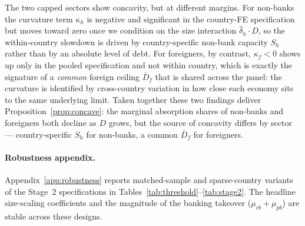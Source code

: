 \documentclass[\latexroot/\projectname]{subfiles}
\begin{document}
The two capped sectors show concavity, but at different margins.
For non-banks the curvature term $\kappa_h$ is negative and
significant in the country-FE specification but moves toward zero
once we condition on the size interaction $\hat\delta_h\!\cdot D$,
so the within-country slowdown is driven by country-specific
non-bank capacity $S_h$ rather than by an absolute level of debt.
For foreigners, by contrast, $\kappa_f<0$ shows up only in the
pooled specification and not within country, which is exactly the
signature of a \emph{common} foreign ceiling $\bar D_f$ that is
shared across the panel: the curvature is identified by
cross-country variation in how close each economy sits to the same
underlying limit. Taken together these two findings deliver
Proposition~\ref{prop:concave}: the marginal absorption shares of
non-banks and foreigners both decline as $D$ grows, but the source
of concavity differs by sector --- country-specific $S_h$ for
non-banks, a common $\bar D_f$ for foreigners.

\paragraph{Robustness appendix.}
Appendix~\ref{app:robustness} reports matched-sample and
sparse-country variants of the Stage~2 specifications in
Tables~\ref{tab:threshold}--\ref{tab:stage2}. The headline
size-scaling coefficients and the magnitude of the banking takeover
($\mu_{cb}+\mu_{pb}$) are stable across these designs.

\smartbib
\end{document}

